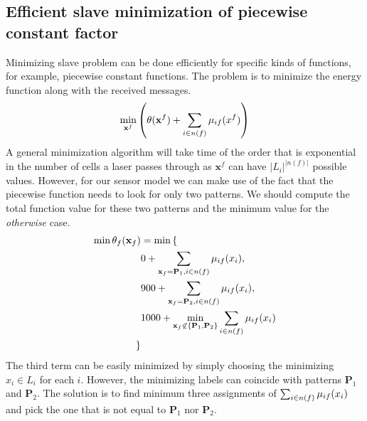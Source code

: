 \documentclass[letterpaper, 10 pt, conference]{ieeeconf} %
\DeclareMathOperator*{\argmin}{arg\,min}
\newcommand{\vect}[1]{\mathbf{#1}}
\begin{document}
\subsection{Efficient slave minimization of piecewise constant factor}
Minimizing slave problem can be done efficiently for specific kinds of functions, for example, piecewise constant functions.
The problem is to minimize the energy function along with the received messages.
\begin{align}
  \min_{\vect{x}^f} \left( \theta(\vect{x}^f) + \sum_{i \in n(f)}\msg{i}{f}{x^f} \right)
\end{align}
A general minimization algorithm will take time of the order that is exponential in the number of cells a laser passes through as $\vect{x}^f$ can have $|L_i|^{|n(f)|}$ possible values. However, for our sensor model we can make use of the fact that the piecewise function needs to look for only two patterns. We should compute the total function value for these two patterns and the minimum value for the \emph{otherwise} case. 
\begin{align}
  \min \theta_f(\vect{x}_f) &= \min \left\{\right.\\
                            &0 + \sum_{\vect{x}_f = \vect{P}_1, i \in n(f)}\msg{i}{f}{x_i},\\
                            &900 + \sum_{\vect{x}_f = \vect{P}_2, i \in n(f)}\msg{i}{f}{x_i},\\
                            &1000 + \min_{\vect{x}_f \not\in \{\vect{P}_1, \vect{P}_2\}} \sum_{i \in n(f)}\msg{i}{f}{x_i}\\
\left.\right\}
\end{align}
The third term can be easily minimized by 
simply choosing the minimizing $x_i \in L_i$ for each $i$. However, the minimizing labels can coincide with patterns $\vect{P}_1$ and $\vect{P}_2$. The solution is to find minimum three assignments of $\sum_{i \in n(f)}\mu_{if}(x_i)$ and pick the one that is not equal to $\vect{P}_1$ nor $\vect{P}_2$. 

%
\end{document}
